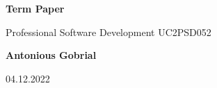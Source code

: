 \begin{titlepage}
	\begin{center}
		\vspace*{1cm}
		\Huge
		\textbf{Term Paper}
		
		\vspace{0.5cm}
		Professional Software Development
		UC2PSD052
		
		\vspace{5cm}
		\textbf{Antonious Gobrial}
		
		04.12.2022
		
		
		
	\end{center}
\end{titlepage}